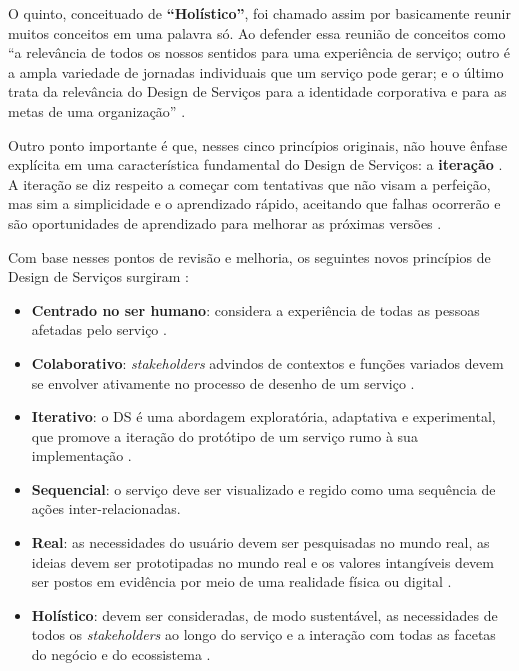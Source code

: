 O quinto, conceituado de \textbf{``Holístico''}, foi chamado assim por basicamente reunir muitos conceitos em uma palavra só. Ao defender essa reunião de conceitos como ``a relevância de todos os nossos sentidos para uma experiência de serviço; outro é a ampla variedade de jornadas individuais que um serviço pode gerar; e o último trata da relevância do Design de Serviços para a identidade corporativa e para as metas de uma organização'' \cite{Stickdorn2019}.

Outro ponto importante é que, nesses cinco princípios originais, não houve ênfase explícita em uma característica fundamental do Design de Serviços: a \textbf{iteração} \cite{Stickdorn2019}. A iteração se diz respeito a começar com tentativas que não visam a perfeição, mas sim a simplicidade e o aprendizado rápido, aceitando que falhas ocorrerão e são oportunidades de aprendizado para melhorar as próximas versões \cite{kumar2023rheumatology}.

Com base nesses pontos de revisão e melhoria, os seguintes novos princípios de Design de Serviços surgiram \cite{Stickdorn2019}:

\begin{itemize}

	\item \textbf{Centrado no ser humano}: considera a experiência de todas as pessoas afetadas pelo serviço \cite{Stickdorn2019, Norman2016Applying, mager2023product}.
	
	
	\item \textbf{Colaborativo}: \textit{stakeholders} advindos de contextos e funções variados devem se envolver ativamente no processo de desenho de um serviço \cite{Stickdorn2019, iriarte2023service, milton2021eatingdisorders}.
	
	\item \textbf{Iterativo}: o DS é uma abordagem exploratória, adaptativa e experimental, que promove a iteração do protótipo de um serviço rumo à sua implementação \cite{Stickdorn2019, kumar2023rheumatology, paust2025integrative}.
	
	\item \textbf{Sequencial}: o serviço deve ser visualizado e regido como uma sequência de ações inter-relacionadas.
	
	\item \textbf{Real}: as necessidades do usuário devem ser pesquisadas no mundo real, as ideias devem ser prototipadas no mundo real e os valores intangíveis devem ser postos em evidência por meio de uma realidade física ou digital \cite{Stickdorn2019, mager2023product, asbjornsen2022echange, lambe2022capabilities}.
	
	\item \textbf{Holístico}: devem ser consideradas, de modo sustentável, as necessidades de todos os \textit{stakeholders} ao longo do serviço e a interação com todas as facetas do negócio e do ecossistema \cite{Stickdorn2019, Tolle2024Vink, lee2022how}.
\end{itemize}

